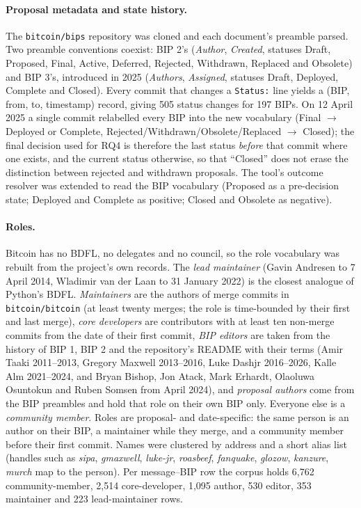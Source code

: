 \documentclass[sigconf,screen]{acmart}
\begin{document}
\paragraph{Proposal metadata and state history.} The \texttt{bitcoin/bips} repository was cloned and each document's preamble parsed. Two preamble conventions coexist: BIP 2's (\emph{Author}, \emph{Created}, statuses Draft, Proposed, Final, Active, Deferred, Rejected, Withdrawn, Replaced and Obsolete) and BIP 3's, introduced in 2025 (\emph{Authors}, \emph{Assigned}, statuses Draft, Deployed, Complete and Closed). Every commit that changes a \texttt{Status:} line yields a (BIP, from, to, timestamp) record, giving 505 status changes for 197 BIPs. On 12 April 2025 a single commit relabelled every BIP into the new vocabulary (Final $\to$ Deployed or Complete, Rejected/Withdrawn/Obsolete/Replaced $\to$ Closed); the final decision used for RQ4 is therefore the last status \emph{before} that commit where one exists, and the current status otherwise, so that ``Closed'' does not erase the distinction between rejected and withdrawn proposals. The tool's outcome resolver was extended to read the BIP vocabulary (Proposed as a pre-decision state; Deployed and Complete as positive; Closed and Obsolete as negative).

\paragraph{Roles.} Bitcoin has no BDFL, no delegates and no council, so the role vocabulary was rebuilt from the project's own records. The \emph{lead maintainer} (Gavin Andresen to 7 April 2014, Wladimir van der Laan to 31 January 2022) is the closest analogue of Python's BDFL. \emph{Maintainers} are the authors of merge commits in \texttt{bitcoin/bitcoin} (at least twenty merges; the role is time-bounded by their first and last merge), \emph{core developers} are contributors with at least ten non-merge commits from the date of their first commit, \emph{BIP editors} are taken from the history of BIP 1, BIP 2 and the repository's README with their terms (Amir Taaki 2011--2013, Gregory Maxwell 2013--2016, Luke Dashjr 2016--2026, Kalle Alm 2021--2024, and Bryan Bishop, Jon Atack, Mark Erhardt, Olaoluwa Osuntokun and Ruben Somsen from April 2024), and \emph{proposal authors} come from the BIP preambles and hold that role on their own BIP only. Everyone else is a \emph{community member}. Roles are proposal- and date-specific: the same person is an author on their BIP, a maintainer while they merge, and a community member before their first commit. Names were clustered by address and a short alias list (handles such as \emph{sipa}, \emph{gmaxwell}, \emph{luke-jr}, \emph{roasbeef}, \emph{fanquake}, \emph{glozow}, \emph{kanzure}, \emph{murch} map to the person). Per message--BIP row the corpus holds 6,762 community-member, 2,514 core-developer, 1,095 author, 530 editor, 353 maintainer and 223 lead-maintainer rows.
\end{document}
